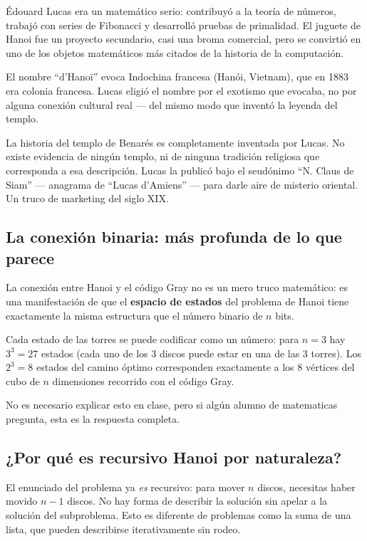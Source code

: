 \documentclass[12pt, oneside]{article}
\begin{document}
Édouard Lucas era un matemático serio: contribuyó a la teoría de números,
trabajó con series de Fibonacci y desarrolló pruebas de primalidad.
El juguete de Hanoi fue un proyecto secundario, casi una broma comercial,
pero se convirtió en uno de los objetos matemáticos más citados de la
historia de la computación.

El nombre ``d'Hanoï'' evoca Indochina francesa (Hanói, Vietnam), que en
1883 era colonia francesa.  Lucas eligió el nombre por el exotismo que
evocaba, no por alguna conexión cultural real — del mismo modo que inventó
la leyenda del templo.

\begin{notaprofesor}
  La historia del templo de Benarés es completamente inventada por Lucas.
  No existe evidencia de ningún templo, ni de ninguna tradición religiosa
  que corresponda a esa descripción.  Lucas la publicó bajo el seudónimo
  ``N. Claus de Siam'' — anagrama de ``Lucas d'Amiens'' — para darle aire
  de misterio oriental.  Un truco de marketing del siglo XIX.
\end{notaprofesor}

\subsection{La conexión binaria: más profunda de lo que parece}

La conexión entre Hanoi y el código Gray no es un mero truco matemático:
es una manifestación de que el \textbf{espacio de estados} del problema
de Hanoi tiene exactamente la misma estructura que el número binario de
$n$ bits.

Cada estado de las torres se puede codificar como un número: para $n=3$
hay $3^3 = 27$ estados (cada uno de los 3 discos puede estar en una de las
3 torres).  Los $2^3 = 8$ estados del camino óptimo corresponden exactamente
a los 8 vértices del cubo de $n$ dimensiones recorrido con el código Gray.

No es necesario explicar esto en clase, pero si algún alumno de matematicas
pregunta, esta es la respuesta completa.

\subsection{¿Por qué es recursivo Hanoi por naturaleza?}

El enunciado del problema ya \textit{es} recursivo: para mover $n$ discos,
necesitas haber movido $n-1$ discos.  No hay forma de describir la solución
sin apelar a la solución del subproblema.  Esto es diferente de problemas
como la suma de una lista, que pueden describirse iterativamente sin rodeo.
\end{document}

